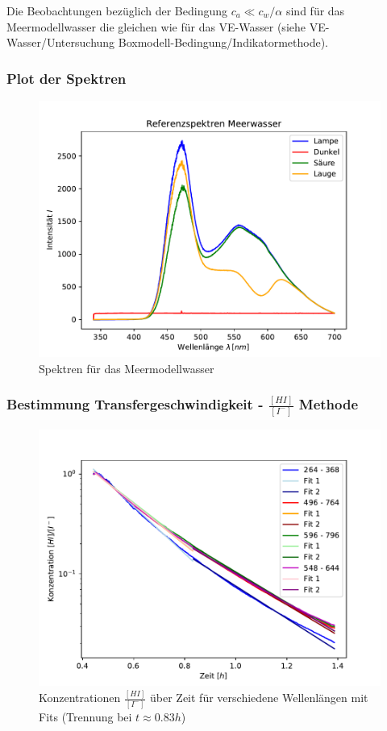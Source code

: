 \documentclass[12pt]{article}
\begin{document}
Die Beobachtungen bezüglich der Bedingung $c_a \ll c_w/\alpha $ sind für das Meermodellwasser die gleichen wie für das VE-Wasser (siehe VE-Wasser/Untersuchung Boxmodell-Bedingung/Indikatormethode).

\subsubsection{Plot der Spektren}

\begin{figure}[H]
	\centering
	\includegraphics[width=120mm]{Meerwasser/Referenzspektren}
	\caption{Spektren für das Meermodellwasser}
\end{figure}

\subsubsection{Bestimmung Transfergeschwindigkeit - $\frac{[HI]}{[I^-]}$ Methode}
\begin{figure}[H]
	\centering
	\includegraphics[width=120mm]{Meerwasser/TransferhIKnick}
	\caption{Konzentrationen $\frac{[HI]}{[I^-]}$ über Zeit für verschiedene Wellenlängen mit Fits (Trennung bei $t \approx 0.83h$)}
\end{figure}
\end{document}

